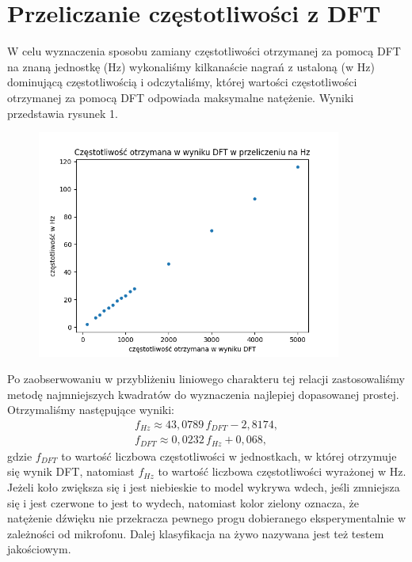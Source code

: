\documentclass[polish]{article}
\begin{document}
\section{Przeliczanie częstotliwości z DFT}
W celu wyznaczenia sposobu zamiany częstotliwości otrzymanej za pomocą DFT na znaną jednostkę (Hz) wykonaliśmy kilkanaście nagrań z ustaloną (w Hz) dominującą częstotliwością i odczytaliśmy, której wartości częstotliwości otrzymanej za pomocą DFT odpowiada maksymalne natężenie. Wyniki przedstawia rysunek 1.
\begin{figure}[H]
	\centering
	\includegraphics[width=10cm]{przeliczanie_dft_hz}
	\caption{}
\end{figure}
\noindent Po zaobserwowaniu w przybliżeniu liniowego charakteru tej relacji zastosowaliśmy metodę najmniejszych kwadratów do wyznaczenia najlepiej dopasowanej prostej. Otrzymaliśmy następujące wyniki:
\begin{gather*}
	f_{\unit{Hz}}\approx43,0789\,f_{\unit{DFT}}-2,8174,\\
	f_{\unit{DFT}}\approx0,0232\,f_{\unit{Hz}}+0,068,
\end{gather*}
gdzie $f_{\unit{DFT}}$ to wartość liczbowa częstotliwości w jednostkach, w której otrzymuje się wynik DFT, natomiast $f_{\unit{Hz}}$ to wartość liczbowa częstotliwości wyrażonej w \unit{Hz}.
Jeżeli koło zwiększa się i jest niebieskie to model wykrywa wdech, jeśli zmniejsza się i jest
czerwone to jest to wydech, natomiast kolor zielony oznacza, że natężenie dźwięku nie przekracza pewnego 
progu dobieranego eksperymentalnie w zależności od mikrofonu.
Dalej klasyfikacja na żywo nazywana jest też testem jakościowym.
\end{document}
